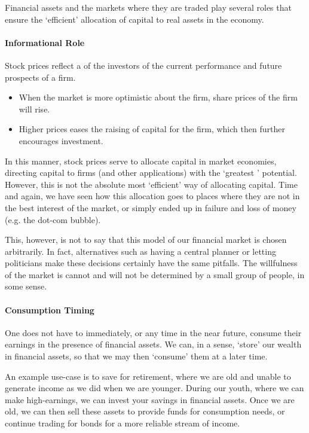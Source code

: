 \documentclass[notoc,notitlepage]{tufte-book}
\begin{document}
Financial assets and the markets where they are traded
play several roles that ensure the `efficient' allocation
of capital to real assets in the economy.

\paragraph{Informational Role} Stock prices reflect a 
of the investors of the current performance and future prospects of a firm.
\begin{itemize}
  \item When the market is more optimistic about the firm,
    share prices of the firm will rise.
  \item Higher prices eases the raising of capital for the firm,
    which then further encourages investment.
\end{itemize}

In this manner, stock prices serve to allocate capital in market economies,
directing capital to firms (and other applications) with
the `greatest ' potential.
However, this is not the absolute most `efficient' way of allocating capital.
Time and again, we have seen how this allocation goes to places where they
are not in the best interest of the market, or simply ended up in failure
and loss of money (e.g. the dot-com bubble).

This, however, is not to say that this model of our financial market is chosen
arbitrarily. In fact, alternatives such as having a central planner or
letting politicians make these decisions certainly have the same pitfalls.
The willfulness of the market is cannot and will not be determined
by a small group of people, in some sense.

\paragraph{Consumption Timing} One does not have to immediately,
or any time in the near future, consume their earnings in the presence
of financial assets. We can, in a sense, `store' our wealth in financial assets,
so that we may then `consume' them at a later time.

An example use-case is to save for retirement, where we are old and unable
to generate income as we did when we are younger.
During our youth, where we can make high-earnings, we can invest your savings
in financial assets.
Once we are old, we can then sell these assets to provide funds for consumption
needs, or continue trading for bonds for a more reliable stream of income.
\end{document}

